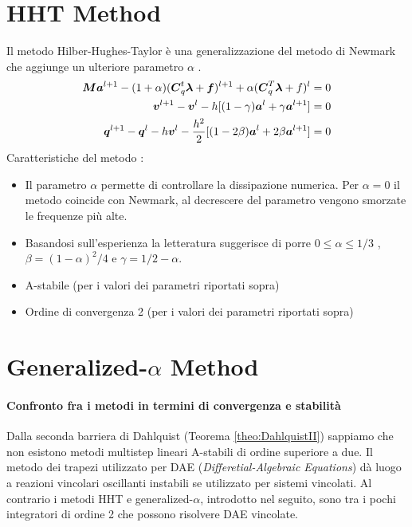  \section{HHT Method}
 Il metodo Hilber-Hughes-Taylor è una generalizzazione del metodo di Newmark che aggiunge un ulteriore parametro $\alpha$ \cite{Negrut2006}. 
 \begin{align}
{\boldsymbol{M}}{\boldsymbol{a}}^{l+1}-(1+\alpha)({\boldsymbol{C}}_q^t{\boldsymbol{\lambda}}+{\boldsymbol{f}})^{l+1}+\alpha({\boldsymbol{C}}_q^T{\boldsymbol{\lambda}}+f)^l&=0 \\
{\boldsymbol{v}}^{l+1}-{\boldsymbol{v}}^l-h[(1-\gamma){\boldsymbol{a}}^l+\gamma{\boldsymbol{a}}^{l+1}] &=0 \\
{\boldsymbol{q}}^{l+1}-{\boldsymbol{q}}^l-h{\boldsymbol{v}}^l-\frac{h^2}{2}[(1-2\beta){\boldsymbol{a}}^l+2\beta{\boldsymbol{a}}^{l+1}] &=0
 \end{align}
 Caratteristiche del metodo \cite{Hilber1977} \cite{Hughes1983}:
\begin{itemize}
    \item Il parametro $\alpha$ permette di controllare la dissipazione numerica. Per $\alpha = 0$ il metodo coincide con Newmark, al decrescere del parametro vengono smorzate le frequenze più alte.
    \item Basandosi sull'esperienza la letteratura suggerisce di porre $0\leq \alpha \leq1/3$ , $\beta = (1-\alpha)^2/4 $ e $\gamma = 1/2 - \alpha$.  
    \item A-stabile (per i valori dei parametri riportati sopra)
    \item Ordine di convergenza 2 (per i valori dei parametri riportati sopra)
\end{itemize}
\section{Generalized-$\alpha$ Method}
\paragraph{Confronto fra i metodi in termini di convergenza e stabilità}
Dalla seconda barriera di Dahlquist (Teorema \ref{theo:DahlquistII}) sappiamo che non esistono metodi multistep lineari A-stabili di ordine superiore a due. Il metodo dei trapezi utilizzato per DAE (\emph{Differetial-Algebraic Equations}) dà luogo a reazioni vincolari oscillanti instabili se utilizzato per sistemi vincolati. Al contrario i metodi HHT e generalized-$\alpha$, introdotto nel seguito, sono tra i pochi integratori di ordine 2 che possono risolvere DAE vincolate.

